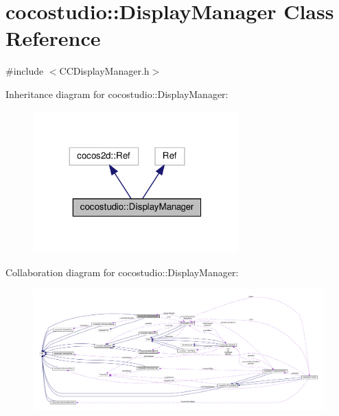 \hypertarget{classcocostudio_1_1DisplayManager}{}\section{cocostudio\+:\+:Display\+Manager Class Reference}
\label{classcocostudio_1_1DisplayManager}


{\ttfamily \#include $<$C\+C\+Display\+Manager.\+h$>$}



Inheritance diagram for cocostudio\+:\+:Display\+Manager\+:
\nopagebreak
\begin{figure}[H]
\begin{center}
\leavevmode
\includegraphics[width=224pt]{classcocostudio_1_1DisplayManager__inherit__graph}
\end{center}
\end{figure}


Collaboration diagram for cocostudio\+:\+:Display\+Manager\+:
\nopagebreak
\begin{figure}[H]
\begin{center}
\leavevmode
\includegraphics[width=350pt]{classcocostudio_1_1DisplayManager__coll__graph}
\end{center}
\end{figure}
